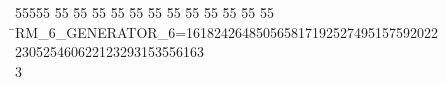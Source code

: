 %
%
\begin{tabbing}
55555 \= 55 \= 55 \= 55 \= 55 \= 55 \= 55 \= 55 \= 55 \= 55 \= 55 \= 55 \= 55 \= \>RM\_6\_GENERATOR\_6=161824264850565817192527495157592022\\[0pt]
230525460622123293153556163\\[0pt]
3\>\end{tabbing}
